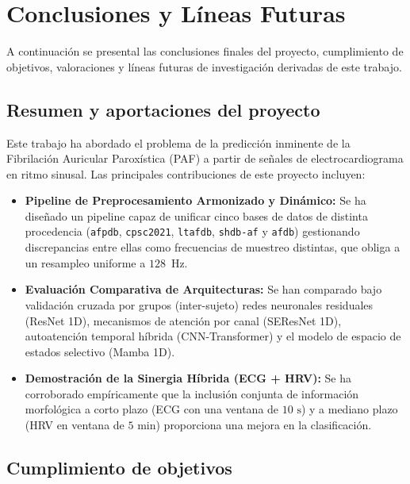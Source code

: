 
\chapter{Conclusiones y Líneas Futuras}
\label{chap:conclusiones}

A continuación se presental las conclusiones finales del proyecto, cumplimiento de objetivos, valoraciones
y líneas futuras de investigación derivadas de este trabajo.

\section{Resumen y aportaciones del proyecto}
\label{sec:resumen_conclusiones}

Este trabajo ha abordado el problema de la predicción inminente de la
Fibrilación Auricular Paroxística (PAF) a partir de señales de electrocardiograma en ritmo sinusal.
Las principales contribuciones de este proyecto incluyen:

\begin{itemize}
  \item \textbf{Pipeline de Preprocesamiento Armonizado y Dinámico:}
  Se ha diseñado un pipeline capaz de unificar cinco bases de datos de distinta procedencia
  (\texttt{afpdb}, \texttt{cpsc2021}, \texttt{ltafdb}, \texttt{shdb-af} y \texttt{afdb})
  gestionando discrepancias entre ellas como frecuencias de muestreo distintas, que obliga a un
  resampleo uniforme a $128$~Hz.
  \item \textbf{Evaluación Comparativa de Arquitecturas:}
  Se han comparado bajo validación cruzada por grupos (inter-sujeto)
  redes neuronales residuales (ResNet 1D), mecanismos de atención por canal (SEResNet 1D),
  autoatención temporal híbrida (CNN-Transformer) y el modelo de espacio de estados selectivo
  (Mamba 1D).
  \item \textbf{Demostración de la Sinergia Híbrida (ECG + HRV):}
  Se ha corroborado empíricamente que la inclusión conjunta de información morfológica a corto plazo
  (ECG con una ventana de $10\text{ s}$) y a mediano plazo (HRV en ventana de
  $5\text{ min}$) proporciona una mejora en la clasificación.
\end{itemize}

\section{Cumplimiento de objetivos}
\label{sec:cumplimiento_objetivos}

